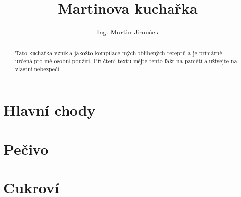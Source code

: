 \documentclass[%
a4paper,
11pt
]{article}
\begin{document}
\title{Martinova kuchařka}
\author{\href{martin.luther.jirousek@gmail.com}{Ing. Martin Jiroušek}}
\maketitle

\begin{abstract}
	Tato kuchařka vznikla jakožto kompilace mých oblíbených receptů a je primárně určená pro mé osobní použití. Při čtení textu mějte tento fakt na paměti a užívejte na vlastní nebezpečí.
\end{abstract}

\tableofcontents

\vspace{5em}


%

\section{Hlavní chody}




\section{Pečivo}


\section{Cukroví}

\end{document}
